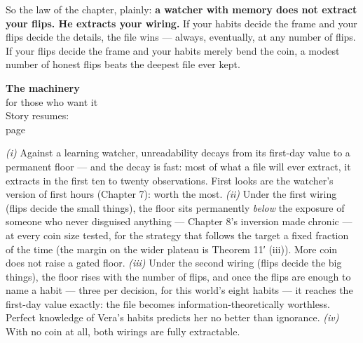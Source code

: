 So the law of the chapter, plainly: \textbf{a watcher with memory does not
extract your flips. He extracts your wiring.} If your habits decide
the frame and your flips decide the details, the file wins --- always,
eventually, at any number of flips. If your flips decide the frame
and your habits merely bend the coin, a modest number of honest flips
beats the deepest file ever kept.

\begin{machinery}{\textbf{The machinery}\\for those who want it\\[3pt]{\color{muted}Story resumes:\\page~\pageref{partIV}}}



\label{claim-14}

\noindent \emph{(i)} Against a learning watcher, unreadability decays from its
first-day value to a permanent floor --- and the decay is fast: most of
what a file will ever extract, it extracts in the first ten to twenty
observations. First looks are the watcher's version of first hours
(Chapter 7): worth the most.
\emph{(ii)} Under the first wiring (flips decide the small things), the floor sits permanently \emph{below} the
exposure of someone who never disguised anything --- Chapter 8's
inversion made chronic --- at every coin size tested, for the strategy
that follows the target a fixed fraction of the time (the margin on
the wider plateau is Theorem 11′ (iii)). More coin does not
raise a gated floor.
\emph{(iii)} Under the second wiring (flips decide the big things), the floor
rises with the number of flips, and once the flips are enough to name
a habit --- three per decision, for this world's eight habits --- it
reaches the first-day value
exactly: the file becomes information-theoretically worthless. Perfect
knowledge of Vera's habits predicts her no better than ignorance.
\emph{(iv)} With no coin at all, both wirings are fully extractable.


\label{claim-15}


\end{machinery}
